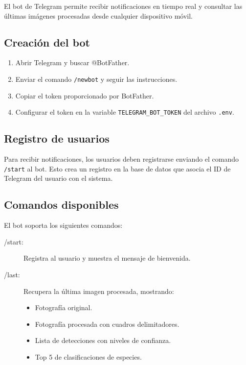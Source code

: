\documentclass[a4paper, 12pt]{report}
\begin{document}
El bot de Telegram permite recibir notificaciones en tiempo real y
consultar las últimas imágenes procesadas desde cualquier dispositivo
móvil.

\subsection{Creación del bot}

\begin{enumerate}
  \item Abrir Telegram y buscar @BotFather.
  \item Enviar el comando \texttt{/newbot} y seguir las instrucciones.
  \item Copiar el token proporcionado por BotFather.
  \item Configurar el token en la variable \texttt{TELEGRAM\_BOT\_TOKEN}
    del archivo \texttt{.env}.
\end{enumerate}

\subsection{Registro de usuarios}

Para recibir notificaciones, los usuarios deben registrarse enviando
el comando \texttt{/start} al bot. Esto crea un registro en la base
de datos que asocia el ID de Telegram del usuario con el sistema.

\subsection{Comandos disponibles}

El bot soporta los siguientes comandos:

\begin{description}
  \item[/start:] Registra al usuario y muestra el mensaje de bienvenida.
  \item[/last:] Recupera la última imagen procesada, mostrando:
    \begin{itemize}
      \item Fotografía original.
      \item Fotografía procesada con cuadros delimitadores.
      \item Lista de detecciones con niveles de confianza.
      \item Top 5 de clasificaciones de especies.
    \end{itemize}
\end{description}
\end{document}
